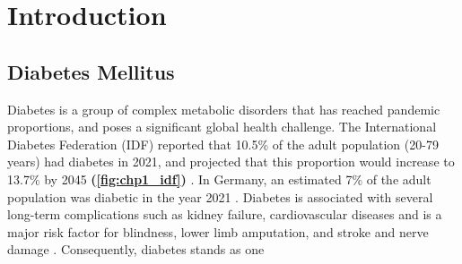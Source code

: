 

\chapter{Introduction}  %
\label{chp:introduction}

\newpage\null\thispagestyle{empty}\newpage



\section{Diabetes Mellitus}  %
\label{sec:int_diabetes}



Diabetes is a group of complex metabolic disorders that has reached pandemic proportions, and poses a significant global health challenge. The International Diabetes Federation (IDF) reported that 10.5\% of the adult population (20-79 years) had diabetes in 2021, and projected that this proportion would increase to 13.7\% by 2045 \textbf{(\autoref{fig:chp1_idf})} \textbf{\cite{home_idf_nodate}}. In Germany, an estimated 7\% of the adult population was diabetic in the year 2021 \textbf{\cite{noauthor_germany_nodate}}. Diabetes is associated with several long-term complications such as kidney failure, cardiovascular diseases and is a major risk factor for blindness, lower limb amputation,%
 and stroke and nerve damage \textbf{\cite{ashcroft_diabetes_2012,the_emerging_risk_factors_collaboration_diabetes_2010,leon_diabetes_2015}}. Consequently, diabetes stands as one \\

